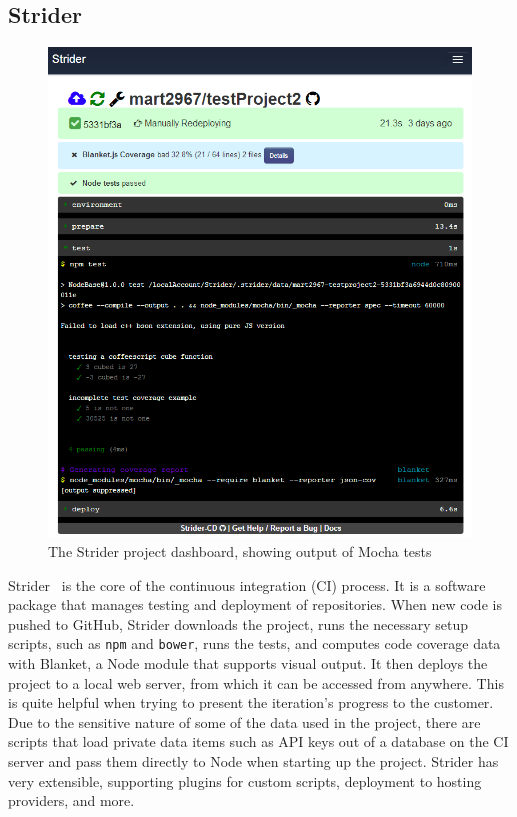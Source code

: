 \documentclass[12pt]{article}
\newcommand{\code}[1]{{\texttt {#1}}}
\begin{document}
\subsection{Strider}\label{sec:strider}
\begin{figure}[h!]
\includegraphics[width=\linewidth]{img/strider_2.png}
\caption{The Strider project dashboard, showing output of Mocha tests}
\end{figure}
Strider~\cite{Strider} is the core of the continuous integration (CI) process. It is a software package that manages testing and deployment of repositories. When new code is pushed to GitHub, Strider downloads the project, runs the necessary setup scripts, such as \code{npm} and \code{bower}, runs the tests, and computes code coverage data with Blanket, a Node module that supports visual output. It then deploys the project to a local web server, from which it can be accessed from anywhere. This is quite helpful when trying to present the iteration's progress to the customer. Due to the sensitive nature of some of the data used in the project, there are scripts that load private data items such as API keys out of a database on the CI server and pass them directly to Node when starting up the project. Strider has very extensible, supporting plugins for custom scripts, deployment to hosting providers, and more.
\end{document}

